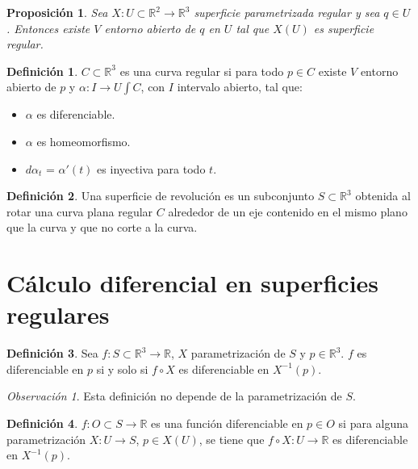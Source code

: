 \documentclass{report}
\newtheorem{proposition}[theorem]{Proposición}
\theoremstyle{remark}
\newtheorem*{remark}{Observación}
\theoremstyle{remark}
\theoremstyle{definition}
\newtheorem{definition}{Definición}[chapter]
\theoremstyle{definition}
\theoremstyle{definition}
\begin{document}
\begin{proposition}
    Sea $X : U \subset \mathbb{R}^2 \to \mathbb{R}^3$ superficie parametrizada regular y sea $q \in U$.
    Entonces existe $V$ entorno abierto de $q$ en $U$ tal que $X(U)$ es superficie regular.
\end{proposition}

\begin{definition}
    $C \subset \mathbb{R}^3$ es una curva regular si para todo $p \in C$ existe $V$ entorno abierto de $p$ y $\alpha : I \to U \int C$, con $I$ intervalo abierto, tal que:
    \begin{itemize}
        \item $\alpha$ es diferenciable.
        \item $\alpha$ es homeomorfismo.
        \item $d\alpha_t$ = $\alpha'(t)$ es inyectiva para todo $t$.
    \end{itemize}
\end{definition}

\begin{definition}
    Una superficie de revolución es un subconjunto $S \subset \mathbb{R}^3$ obtenida al rotar una curva plana regular $C$ alrededor de un eje contenido en el mismo plano que la curva y que no corte a la curva.
\end{definition}

\section{Cálculo diferencial en superficies regulares}

\begin{definition}
    Sea $f: S \subset \mathbb{R}^3 \to \mathbb{R}$, $X$ parametrización de $S$ y $p \in \mathbb{R}^3$.
    $f$ es diferenciable en $p$ si y solo si $f \circ X$ es diferenciable en $X^{-1}(p)$.
\end{definition}

\begin{remark}
    Esta definición no depende de la parametrización de $S$.
\end{remark}

\begin{definition}
    $f: O \subset S \to \mathbb{R}$ es una función diferenciable en $p \in O$ si para alguna parametrización $X : U \to S$, $p \in X(U)$, se tiene que $f \circ X : U \to \mathbb{R}$ es diferenciable en $X^{-1}(p)$.
\end{definition}
\end{document}
